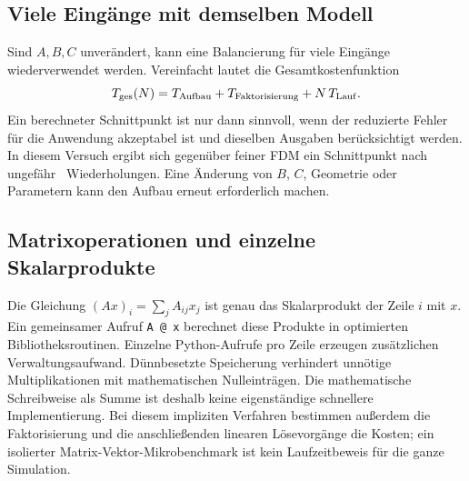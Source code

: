 \subsection{Viele Eingänge mit demselben Modell}
Sind $A,B,C$ unverändert, kann eine Balancierung für viele Eingänge wiederverwendet werden. Vereinfacht lautet die Gesamtkostenfunktion
\begin{equation}
 T_{\rm ges}(N)=T_{\rm Aufbau}+T_{\rm Faktorisierung}+N\,T_{\rm Lauf}.
\end{equation}
Ein berechneter Schnittpunkt ist nur dann sinnvoll, wenn der reduzierte Fehler für die Anwendung akzeptabel ist und dieselben Ausgaben berücksichtigt werden. In diesem Versuch ergibt sich gegenüber feiner FDM ein Schnittpunkt nach ungefähr \BreakEven\ Wiederholungen. Eine Änderung von $B$, $C$, Geometrie oder Parametern kann den Aufbau erneut erforderlich machen.

\subsection{Matrixoperationen und einzelne Skalarprodukte}
Die Gleichung $(Ax)_i=\sum_jA_{ij}x_j$ ist genau das Skalarprodukt der Zeile $i$ mit $x$. Ein gemeinsamer Aufruf \texttt{A @ x} berechnet diese Produkte in optimierten Bibliotheksroutinen. Einzelne Python-Aufrufe pro Zeile erzeugen zusätzlichen Verwaltungsaufwand. Dünnbesetzte Speicherung verhindert unnötige Multiplikationen mit mathematischen Nulleinträgen. Die mathematische Schreibweise als Summe ist deshalb keine eigenständige schnellere Implementierung. Bei diesem impliziten Verfahren bestimmen außerdem die Faktorisierung und die anschließenden linearen Lösevorgänge die Kosten; ein isolierter Matrix-Vektor-Mikrobenchmark ist kein Laufzeitbeweis für die ganze Simulation.
